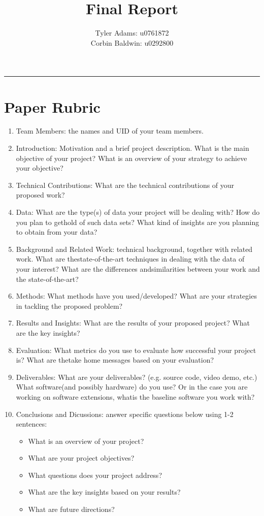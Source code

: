 \documentclass[12pt, fullpage,letterpaper]{article}
\title{Final Report}
\author{Tyler Adams: u0761872 \\Corbin Baldwin: u0292800}
\theoremstyle{definition}
\begin{document}
	\maketitle 
	\hrule 
	\vskip 0.5cm
	\section{Paper Rubric}
	\begin{enumerate}
		\item Team Members:  the names and UID of your team members.
		\item Introduction:  Motivation  and  a  brief  project  description.   What  is  the  main  objective  of  your project?  What is an overview of your strategy to achieve your objective?
		\item Technical Contributions:  What are the technical contributions of your proposed work?
		\item Data:  What are the type(s) of data your project will be dealing with?  How do you plan to gethold of such data sets?  What kind of insights are you planning to obtain from your data?
		\item Background and Related Work:  technical background, together with related work.  What are thestate-of-the-art techniques in dealing with the data of your interest?  What are the differences andsimilarities between your work and the state-of-the-art?
		\item Methods:   What  methods  have  you  used/developed?   What  are  your  strategies  in  tackling  the proposed problem?
		\item Results and Insights:  What are the results of your proposed project?  What are the key insights?
		\item Evaluation:  What metrics do you use to evaluate how successful your project is?  What are thetake home messages based on your evaluation?
		\item Deliverables:  What are your deliverables?  (e.g.  source code,  video demo,  etc.)  What software(and possibly hardware) do you use?  Or in the case you are working on software extensions, whatis the baseline software you work with?
		\item Conclusions and Dicussions:  answer specific questions below using 1-2 sentences:
		\begin{itemize}
			\item What is an overview of your project?
			\item What are your project objectives?
			\item What questions does your project address?
			\item What are the key insights based on your results?
			\item What are future directions?
		\end{itemize}
	\end{enumerate}	
	
\end{document}

